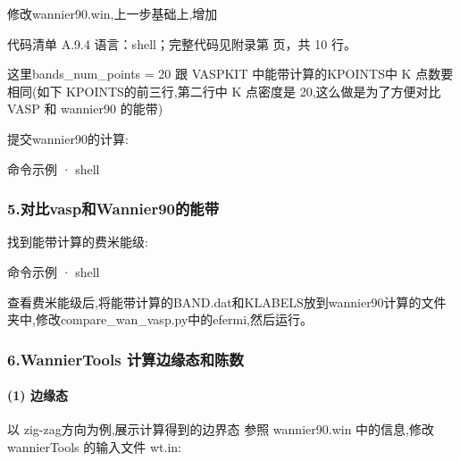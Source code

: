 \documentclass[lang=cn,scheme=chinese,color=blue,device=normal,toc=onecol,math=cm]{elegantbook}
\begin{document}
修改wannier90.win,上一步基础上,增加\par


\begin{codeindexbox}{代码清单 A.9.4}
语言：shell；完整代码见附录第 \pageref{code:9:4} 页，共 10 行。
\end{codeindexbox}


这里bands\_\allowbreak{}num\_\allowbreak{}points = 20 跟 VASPKIT 中能带计算的KPOINTS中 K 点数要相同(如下 KPOINTS的前三行,第二行中 K 点密度是 20,这么做是为了方便对比 VASP 和 wannier90 的能带)\par


提交wannier90的计算:\par


\begin{inlinecodebox}{命令示例 · shell}
\end{inlinecodebox}


\subsubsection{5.对比vasp和Wannier90的能带}


找到能带计算的费米能级:\par


\begin{inlinecodebox}{命令示例 · shell}
\end{inlinecodebox}


查看费米能级后,将能带计算的BAND.dat和KLABELS放到wannier90计算的文件夹中,修改compare\_\allowbreak{}wan\_\allowbreak{}vasp.py中的efermi,然后运行。\par


\subsubsection{6.WannierTools 计算边缘态和陈数}


\paragraph{(1) 边缘态}


以 zig-zag方向为例,展示计算得到的边界态 参照 wannier90.win 中的信息,修改wannierTools 的输入文件 wt.in:\par
\end{document}
